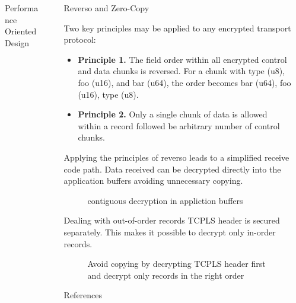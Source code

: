 \documentclass[final]{beamer}
\newlength{\sepwidth}
\newlength{\colwidth}
\newcommand{\separatorcolumn}{\begin{column}{\sepwidth}\end{column}}
\begin{document}
\begin{frame}[t]
\begin{columns}[t]
\begin{column}{\colwidth}
\begin{block}{Performance Oriented Design}
        \end{block}

      \end{column}

      \separatorcolumn

      \begin{column}{\colwidth}

        \begin{block}{Reverso and Zero-Copy}

          Two key principles may be applied to any encrypted transport protocol:

          \begin{itemize}
            \item \textbf{Principle 1.} The field order within all encrypted control and data chunks is reversed.
            For a chunk with type (u8), foo (u16), and bar (u64), the order becomes bar (u64), foo (u16), type (u8).
            \item \textbf{Principle 2.} Only a single chunk of data is allowed within a record followed be arbitrary
            number of control chunks.
          \end{itemize}
          Applying the principles of reverso leads to a simplified receive code path.
          Data received can be decrypted directly into the application buffers avoiding unnecessary copying.
          \begin{figure}
            \centering
            
            \caption{contiguous decryption in appliction buffers}
            \label{fig:zero-copy}
          \end{figure}
        \end{block}

        \begin{block}{Dealing with out-of-order records}
          TCPLS header is secured separately.
          This makes it possible to decrypt only in-order records.
          \begin{figure}
            \centering
            
            \caption{Avoid copying by decrypting TCPLS header first and decrypt only records in the right order}
            \label{fig:reorder}
          \end{figure}
        \end{block}

        \begin{block}{References}

          \nocite{*}
          \footnotesize{}

        \end{block}

      \end{column}

      \separatorcolumn
    \end{columns}
  \end{frame}
\end{document}
